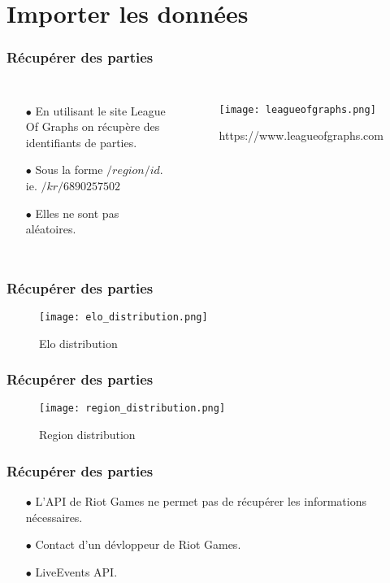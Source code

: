 \documentclass{beamer}
\begin{document}
\section{Importer les données}

\begin{frame}
    \frametitle{Récupérer des parties}
    \begin{columns}
        \begin{enumerate}
            \item[$\bullet$]\footnotesize En utilisant le site League Of Graphs\cite{leaguegraphs} on récupère des identifiants de parties.
            \item[$\bullet$] Sous la forme $/region/id$. \newline
            ie. $/kr/6890257502$
            \item[$\bullet$] Elles ne sont pas aléatoires.
        \end{enumerate}
        \begin{figure}
            \centering
            \texttt{[image: leagueofgraphs.png]}
            \caption{https://www.leagueofgraphs.com}
        \end{figure}
    \end{columns}
\end{frame}

\begin{frame}
    \frametitle{Récupérer des parties}
    \begin{figure}
        \centering
        \texttt{[image: elo\_distribution.png]}
        \caption{Elo distribution}
    \end{figure}
\end{frame}

\begin{frame}
    \frametitle{Récupérer des parties}
    \begin{figure}
        \centering
        \texttt{[image: region\_distribution.png]}
        \caption{Region distribution}
    \end{figure}
\end{frame}

\begin{frame}
    \frametitle{Récupérer des parties}
    \begin{enumerate}
        \item[$\bullet$] L'API de Riot Games ne permet pas de récupérer les informations nécessaires.
        \item[$\bullet$] Contact d'un dévloppeur de Riot Games.
        \item[$\bullet$] LiveEvents API\cite{liveevents}. \newline
    \end{enumerate}
\end{frame}
\end{document}
